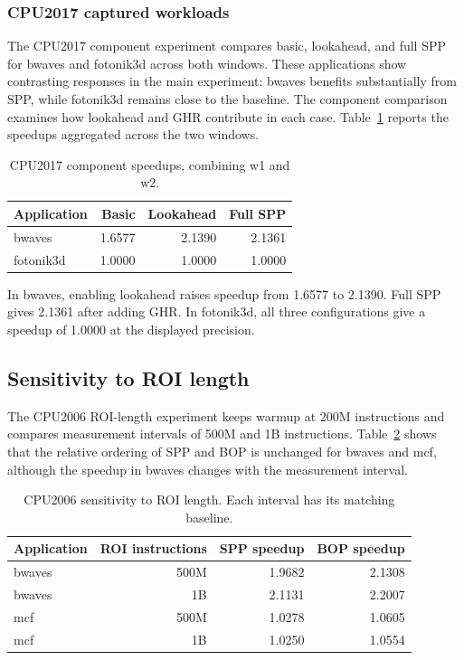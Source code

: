 \documentclass[a4paper,11pt]{article}
\begin{document}
\subsubsection{CPU2017 captured workloads}
The CPU2017 component experiment compares basic, lookahead, and full SPP for bwaves and fotonik3d across both windows. These applications show contrasting responses in the main experiment: bwaves benefits substantially from SPP, while fotonik3d remains close to the baseline. The component comparison examines how lookahead and GHR contribute in each case. Table~\ref{tab:cpu2017ablation} reports the speedups aggregated across the two windows.
\begin{table}[htbp]
\centering
\caption{CPU2017 component speedups, combining w1 and w2.}\label{tab:cpu2017ablation}
\begin{tabular}{@{}lrrr@{}}
\toprule
Application & Basic & Lookahead & Full SPP\\
\midrule
bwaves & 1.6577 & 2.1390 & 2.1361\\
fotonik3d & 1.0000 & 1.0000 & 1.0000\\
\bottomrule
\end{tabular}
\end{table}
In bwaves, enabling lookahead raises speedup from 1.6577 to 2.1390. Full SPP gives 2.1361 after adding GHR. In fotonik3d, all three configurations give a speedup of 1.0000 at the displayed precision.

\subsection{Sensitivity to ROI length}
The CPU2006 ROI-length experiment keeps warmup at 200M instructions and compares measurement intervals of 500M and 1B instructions. Table~\ref{tab:window} shows that the relative ordering of SPP and BOP is unchanged for bwaves and mcf, although the speedup in bwaves changes with the measurement interval.
\begin{table}[htbp]
\centering
\caption{CPU2006 sensitivity to ROI length. Each interval has its matching baseline.}\label{tab:window}
\begin{tabular}{@{}lrrr@{}}
\toprule
Application & ROI instructions & SPP speedup & BOP speedup\\
\midrule
bwaves & 500M & 1.9682 & 2.1308\\
bwaves & 1B & 2.1131 & 2.2007\\
mcf & 500M & 1.0278 & 1.0605\\
mcf & 1B & 1.0250 & 1.0554\\
\bottomrule
\end{tabular}
\end{table}
\end{document}
